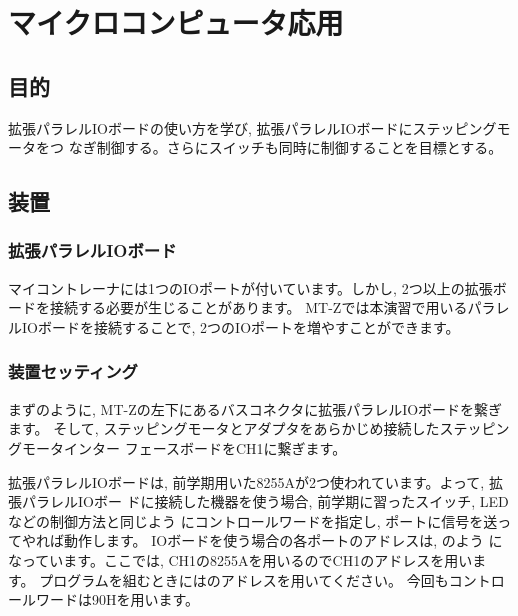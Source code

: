 \chapter{マイクロコンピュータ応用}

\section{目的}

拡張パラレルIOボードの使い方を学び, 拡張パラレルIOボードにステッピングモータをつ
なぎ制御する。さらにスイッチも同時に制御することを目標とする。

\section{装置}
\subsection{拡張パラレルIOボード}

マイコントレーナには1つのIOポートが付いています。しかし,
2つ以上の拡張ボードを接続する必要が生じることがあります。
MT-Zでは本演習で用いるパラレルIOボードを接続することで, 2つのIOポートを増やすことができます。

\subsection{装置セッティング}

まずのように, MT-Zの左下にあるバスコネクタに拡張パラレルIOボードを繋ぎます。
そして, ステッピングモータとアダプタをあらかじめ接続したステッピングモータインター
フェースボードをCH1に繋ぎます。

拡張パラレルIOボードは, 前学期用いた8255Aが2つ使われています。よって, 拡張パラレルIOボー
ドに接続した機器を使う場合, 前学期に習ったスイッチ, LEDなどの制御方法と同じよう
にコントロールワードを指定し, ポートに信号を送ってやれば動作します。
IOボードを使う場合の各ポートのアドレスは, のよう
になっています。ここでは, CH1の8255Aを用いるのでCH1のアドレスを用います。
プログラムを組むときにはのアドレスを用いてください。
今回もコントロールワードは90Hを用います。

